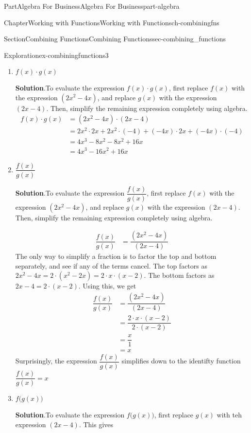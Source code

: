 \documentclass{tufte-book}
\newcommand{\blocktitlefont}{\relax}
\numberwithin{equation}{chapter}
\newcommand{\amp}{&}
\begin{document}
\begin{partptx}{Part}{Algebra For Business}{}{Algebra For Business}{}{}{part-algebra}
\begin{chapterptx}{Chapter}{Working with Functions}{}{Working with Functions}{}{}{ch-combiningfns}
\begin{sectionptx}{Section}{Combining Functions}{}{Combining Functions}{}{}{sec-combining_functions}
\begin{exploration}{Exploration}{}{ex-combiningfunctions3}
\begin{enumerate}[font=\bfseries,label=(\alph*),ref=\alph*]
\item{}\(f(x)\cdot g(x)\)%
\par\smallskip%
\noindent\textbf{\blocktitlefont Solution}.\hypertarget{ex-combiningfunctions3-4-2}{}\quad{}To evaluate the expression \(f(x)\cdot g(x)\), first replace \(f(x)\) with the expression \((2x^2-4x)\), and replace \(g(x)\) with the expression \((2x-4)\).  Then, simplify the remaining expression completely using algebra.%
\begin{align*}
f(x)\cdot g(x)\amp =(2x^2-4x) \cdot (2x-4)\\
\amp = 2x^2\cdot 2x + 2x^2 \cdot (-4) + (-4x)\cdot 2x + (-4x)\cdot (-4) \\
\amp = 4x^3 - 8x^2 - 8x^2 + 16x\\
\amp = 4x^3 - 16x^2 + 16x
\end{align*}
%
\item{}\(\dfrac{f(x)}{g(x)}\)%
\par\smallskip%
\noindent\textbf{\blocktitlefont Solution}.\hypertarget{ex-combiningfunctions3-5-2}{}\quad{}To evaluate the expression \(\dfrac{f(x)}{g(x)}\), first replace \(f(x)\) with the expression \((2x^2-4x)\), and replace \(g(x)\) with the expression \((2x-4)\).  Then, simplify the remaining expression completely using algebra.%
\par
%
\begin{align*}
\dfrac{f(x)}{g(x)} \amp = \dfrac{(2x^2-4x)}{(2x-4)} 
\end{align*}
The only way to simplify a fraction is to factor the top and bottom separately, and see if any of the terms cancel.  The top factors as \(2x^2-4x = 2\cdot(x^2-2x) = 2\cdot x\cdot (x-2)\).  The bottom factors as \(2x-4= 2 \cdot (x-2)\).  Using this, we get%
\begin{align*}
\dfrac{f(x)}{g(x)} \amp = \dfrac{(2x^2-4x)}{(2x-4)} \\
\amp = \dfrac{2\cdot x\cdot (x-2)}{2\cdot (x-2)}\\
\amp = \dfrac{x}{1}\\
\amp = x
\end{align*}
Surprisingly, the expression \(\dfrac{f(x)}{g(x)}\) simplifies down to the identifty function \(\dfrac{f(x)}{g(x)} = x\)%
\item{}\(f\Big(g(x)\Big)\)%
\par\smallskip%
\noindent\textbf{\blocktitlefont Solution}.\hypertarget{ex-combiningfunctions3-6-2}{}\quad{}To evaluate the expression \(f\Big(g(x)\Big)\), first replace \(g(x)\) with teh expression \((2x-4)\).  This gives%
\begin{equation*}

\end{equation*}
\end{enumerate}
\end{exploration}
\end{sectionptx}
\end{chapterptx}
\end{partptx}
\end{document}
